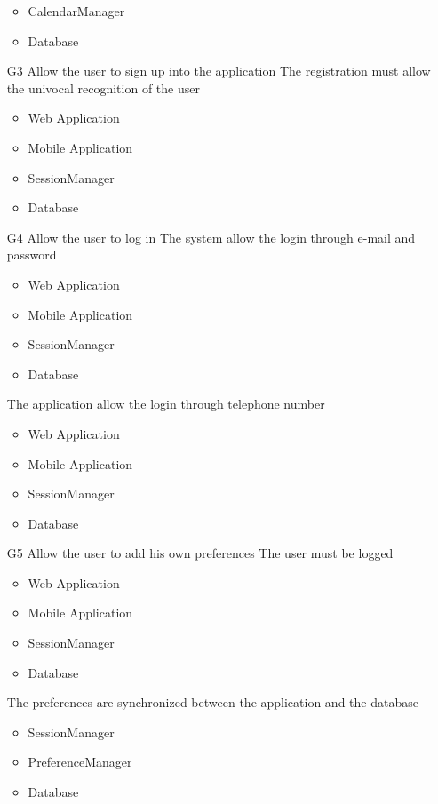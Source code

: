 \begin{itemize}
\begin{itemize}[leftmargin=1in]
 		\item CalendarManager
 		\item Database
 	\end{itemize}
 	\item[G3] Allow the user to sign up into the application
 	\subitem[G3.1] The registration must allow the univocal recognition of the user
 	\begin{itemize}[leftmargin=1in]
 		\item Web Application
 		\item Mobile Application
 		\item SessionManager
 		\item Database
 	\end{itemize}
 	\item[G4] Allow the user to log in
 	\subitem[G4.1] The system allow the login through e-mail and password
 	\begin{itemize}[leftmargin=1in]
 		\item Web Application
 		\item Mobile Application
 		\item SessionManager
 		\item Database
 	\end{itemize}
 	\subitem[G4.2] The application allow the login through telephone number
 	\begin{itemize}[leftmargin=1in]
 		\item Web Application
 		\item Mobile Application
 		\item SessionManager
 		\item Database
 	\end{itemize}
 	\item[G5] Allow the user to add his own preferences
 	\subitem[G5.1] The user must be logged
 	\begin{itemize}[leftmargin=1in]
 		\item Web Application
 		\item Mobile Application
 		\item SessionManager
 		\item Database
 	\end{itemize}
 	\subitem[G5.2] The preferences are synchronized between the application and the database
 	\begin{itemize}[leftmargin=1in]
 		\item SessionManager
 		\item PreferenceManager
 		\item Database

\end{itemize}
\end{itemize}
